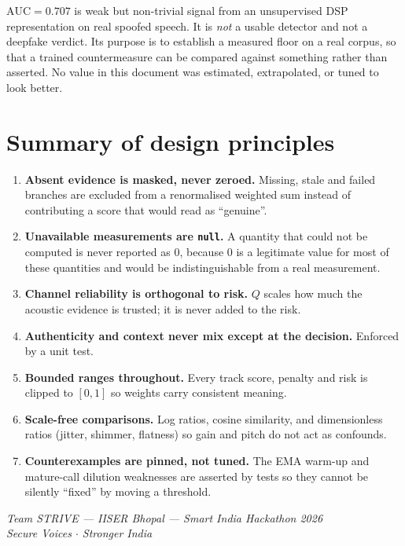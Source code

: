 \documentclass[11pt,a4paper]{article}
\newcommand{\code}[1]{\texttt{\small #1}}
\begin{document}
\begin{tcolorbox}[colback=red!3,colframe=strivewarn,title=\textbf{Interpretation}]
$\mathrm{AUC} = 0.707$ is weak but non-trivial signal from an unsupervised DSP
representation on real spoofed speech. It is \emph{not} a usable detector and not a
deepfake verdict. Its purpose is to establish a measured floor on a real corpus, so that
a trained countermeasure can be compared against something rather than asserted. No
value in this document was estimated, extrapolated, or tuned to look better.
\end{tcolorbox}

\section{Summary of design principles}

\begin{enumerate}[leftmargin=1.6em]
\item \textbf{Absent evidence is masked, never zeroed.} Missing, stale and failed
branches are excluded from a renormalised weighted sum instead of contributing a score
that would read as ``genuine''.
\item \textbf{Unavailable measurements are \code{null}.} A quantity that could not be
computed is never reported as $0$, because $0$ is a legitimate value for most of these
quantities and would be indistinguishable from a real measurement.
\item \textbf{Channel reliability is orthogonal to risk.} $Q$ scales how much the
acoustic evidence is trusted; it is never added to the risk.
\item \textbf{Authenticity and context never mix except at the decision.} Enforced by a
unit test.
\item \textbf{Bounded ranges throughout.} Every track score, penalty and risk is clipped
to $[0,1]$ so weights carry consistent meaning.
\item \textbf{Scale-free comparisons.} Log ratios, cosine similarity, and dimensionless
ratios (jitter, shimmer, flatness) so gain and pitch do not act as confounds.
\item \textbf{Counterexamples are pinned, not tuned.} The EMA warm-up and mature-call
dilution weaknesses are asserted by tests so they cannot be silently ``fixed'' by moving
a threshold.
\end{enumerate}

\vspace{0.8cm}
\begin{center}
\color{strivenavy}\itshape
Team STRIVE --- IISER Bhopal --- Smart India Hackathon 2026\\
\normalfont\small Secure Voices $\cdot$ Stronger India
\end{center}
\end{document}
